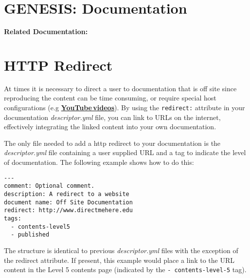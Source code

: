 \documentclass[12pt]{article}
\begin{document}
\section*{GENESIS: Documentation}

{\bf Related Documentation:}

\section*{HTTP Redirect}

At times it is necessary to direct a user to documentation that is off site since reproducing the content can be time consuming, or require special host configurations (e.g \href{http://www.youtube.com/user/genesissim}{\bf YouTube\,videos}). By using the {\tt redirect:} attribute in your documentation {\it descriptor.yml} file, you can link to URLs on the internet, effectively integrating the linked content into your own documentation.

The only file needed to add a http redirect to your documentation is the {\it descriptor.yml} file containing a user supplied URL and a tag to indicate the level of documentation. The following example shows how to do this:
\begin{verbatim}
---
comment: Optional comment.
description: A redirect to a website
document name: Off Site Documentation
redirect: http://www.directmehere.edu
tags:
  - contents-level5
  - published
\end{verbatim}
The structure is identical to previous {\it descriptor.yml} files with the exception of the redirect attribute. If present, this example would place a link to the URL content in the Level 5 contents page (indicated by the {\tt -\,contents-level-5} tag).
\end{document}

